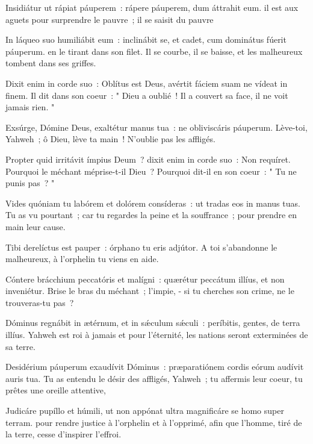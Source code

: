 \begin{paracol}{2}
\LigneParacol{0.2cm}
{Insidiátur ut rápiat páuperem~: \GreStar{} rápere páuperem, dum áttrahit eum.}
{il est aux aguets pour surprendre le pauvre~; il se saisit du pauvre}

\LigneParacol{0.2cm}
{In láqueo suo humiliábit eum~: \GreStar{} inclinábit se, et cadet, cum dominátus fúerit páuperum.}
{en le tirant dans son filet. Il se courbe, il se baisse, et les malheureux tombent dans ses griffes. }

\LigneParacol{0.2cm}
{Dixit enim in corde suo~: Oblítus est Deus, \GreStar{} avértit fáciem suam ne vídeat in finem.}
{Il dit dans son coeur~: " Dieu a oublié~! Il a couvert sa face, il ne voit jamais rien. " }

\end{paracol}
\Gloria
\begin{paracol}{2}

\LigneParacol{0cm}
{Exsúrge, Dómine Deus, exaltétur manus tua~: \GreStar{} ne obliviscáris páuperum.}
{Lève-toi, Yahweh~; ô Dieu, lève ta main~! N'oublie pas les affligés. }

\LigneParacol{0.2cm}
{Propter quid irritávit ímpius Deum~? \GreStar{} dixit enim in corde suo~: Non requíret.}
{Pourquoi le méchant méprise-t-il Dieu~? Pourquoi dit-il en son coeur~: " Tu ne punis pas~? " }

\LigneParacol{0.2cm}
{Vides quóniam tu labórem et dolórem consíderas~: \GreStar{} ut tradas eos in manus tuas.}
{Tu as vu pourtant~; car tu regardes la peine et la souffrance~; pour prendre en main leur cause.}

\LigneParacol{0.2cm}
{Tibi derelíctus est pauper~: \GreStar{} órphano tu eris adjútor.}
{A toi s'abandonne le malheureux, à l'orphelin tu viens en aide. }

\LigneParacol{0.2cm}
{Cóntere brácchium peccatóris et malígni~: \GreStar{} quærétur peccátum illíus, et non inveniétur.}
{Brise le bras du méchant~; l'impie, - si tu cherches son crime, ne le trouveras-tu pas~?}

\LigneParacol{0.2cm}
{Dóminus regnábit in ætérnum, et in sǽculum sǽculi~: \GreStar{} períbitis, gentes, de terra illíus.}
{Yahweh est roi à jamais et pour l'éternité, les nations seront exterminées de sa terre. }

\LigneParacol{0.2cm}
{Desidérium páuperum exaudívit Dóminus~: \GreStar{} præparatiónem cordis eórum audívit auris tua.}
{Tu as entendu le désir des affligés, Yahweh~; tu affermis leur coeur, tu prêtes une oreille attentive, }

\LigneParacol{0.2cm}
{Judicáre pupíllo et húmili, \GreStar{} ut non appónat ultra magnificáre se homo super terram.}
{pour rendre justice à l'orphelin et à l'opprimé, afin que l'homme, tiré de la terre, cesse d'inspirer l'effroi. }

\end{paracol}
